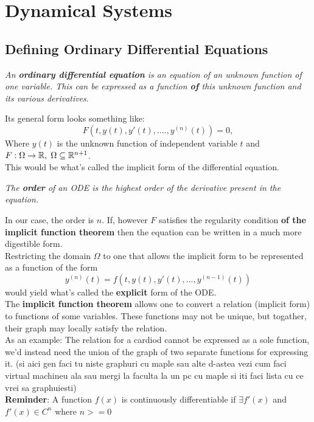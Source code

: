 \chapter{Dynamical Systems}
\label{chap:ch3}


\section{Defining Ordinary Differential Equations}
\begin{definition}
    \textit{An \textbf{ordinary differential equation} is an equation of an unknown function of one variable. This can be expressed as a function \textbf{of} this unknown function and its various derivatives}.
\end{definition}
Its general form looks something like:
\begin{equation}\label{eq:3.1.1}
    F(t,y(t),y'(t),....,y^{(n)}(t))=0,
\end{equation}
Where $y(t)$ is the unknown function of independent variable $t$ and $F : \Omega \rightarrow \mathbb{R},\hspace{0.1cm}\Omega \subseteq \mathbb{R}^{n+1}$. \\
This would be what's called the implicit form of the differential equation.

\begin{definition}
    \textit{The \textbf{order} of an ODE is the highest order of the derivative present in the equation.}
\end{definition}
In our case, the order is $n$.
If, however $F$ satisfies the regularity condition \textbf{of the implicit function theorem} then the equation can be written in a much more digestible form. \\
Restricting the domain $\Omega$ to one that allows the implicit form to be represented as a function of the form
\begin{equation}\label{eq:3.1.2}
    y^{(n)}(t)=f(t,y(t),y'(t),...,y^{(n-1)}(t))
\end{equation}
would yield what's called the \textbf{explicit} form of the ODE. \\

The \textbf{implicit function theorem} allows one to convert a relation (implicit form) to functions of some variables. These functions may not be unique, but togather, their graph may locally satisfy the relation. \\
As an example: The relation for a cardiod cannot be expressed as a sole function, we'd instead need the union of the graph of two separate functions for expressing it.
(si aici gen faci tu niste graphuri cu maple sau alte d-astea vezi cum faci virtual machineu ala sau mergi la faculta la un pc cu maple si iti faci lista cu ce vrei sa graphuiesti) \\
\textbf{Reminder}: A function $f(x)$ is continuously differentiable if $\exists f'(x)$ and $f'(x) \in C^n$ where $n>=0$

